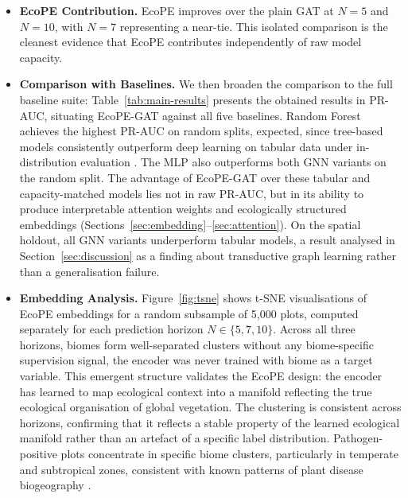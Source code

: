 \documentclass[a4paper,fleqn]{cas-sc}
\begin{document}
\begin{itemize}[leftmargin=1.4em]

\item \textbf{EcoPE Contribution.} EcoPE improves over the plain GAT at $N=5$ and $N=10$, with $N=7$ representing a near-tie. This isolated comparison is the cleanest evidence that EcoPE contributes independently of raw model capacity.

\item \textbf{Comparison with Baselines.} We then broaden the comparison to the full baseline suite: Table~\ref{tab:main-results} presents the obtained results in PR-AUC, situating EcoPE-GAT against all five baselines. Random Forest achieves the highest PR-AUC on random splits, expected, since tree-based models consistently outperform deep learning on tabular data under in-distribution evaluation \citep{grinsztajn2022}. The MLP also outperforms both GNN variants on the random split. The advantage of EcoPE-GAT over these tabular and capacity-matched models lies not in raw PR-AUC, but in its ability to produce interpretable attention weights and ecologically structured embeddings (Sections~\ref{sec:embedding}--\ref{sec:attention}). On the spatial holdout, all GNN variants underperform tabular models, a result analysed in Section~\ref{sec:discussion} as a finding about transductive graph learning rather than a generalisation failure.

\item \textbf{Embedding Analysis.}
\label{sec:embedding}
Figure~\ref{fig:tsne} shows t-SNE visualisations of EcoPE embeddings for a random subsample of 5{,}000 plots, computed separately for each prediction horizon $N \in \{5, 7, 10\}$. Across all three horizons, biomes form well-separated clusters without any biome-specific supervision signal, the encoder was never trained with biome as a target variable. This emergent structure validates the EcoPE design: the encoder has learned to map ecological context into a manifold reflecting the true ecological organisation of global vegetation. The clustering is consistent across horizons, confirming that it reflects a stable property of the learned ecological manifold rather than an artefact of a specific label distribution. Pathogen-positive plots concentrate in specific biome clusters, particularly in temperate and subtropical zones, consistent with known patterns of plant disease biogeography \citep{bebber2014}.


\end{itemize}
\end{document}
